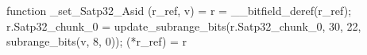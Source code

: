 function _set_Satp32_Asid (r_ref, v) = {
    r = __bitfield_deref(r_ref);
    r.Satp32_chunk_0 = update_subrange_bits(r.Satp32_chunk_0, 30, 22, subrange_bits(v, 8, 0));
    (*r_ref) = r
}
